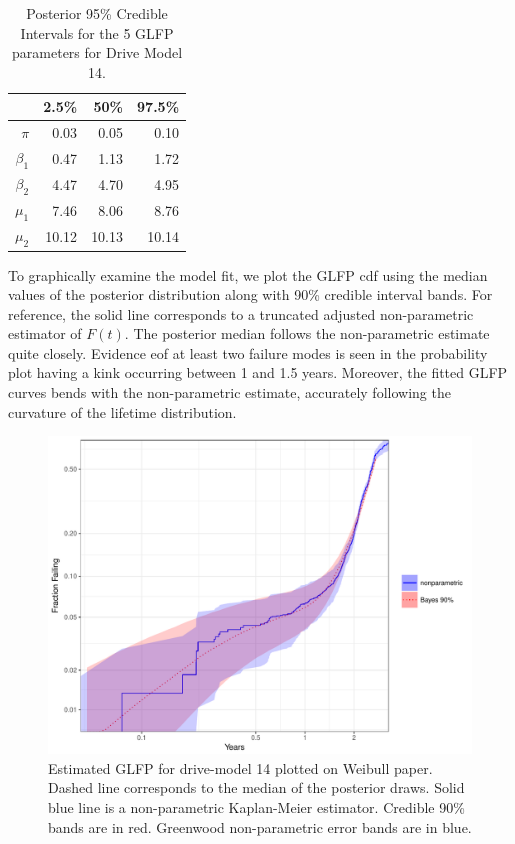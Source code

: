 \documentclass[12pt]{article}
\begin{document}
\begin{table}[H]
\centering
\begin{tabular}{rrrr}
  \hline
 & 2.5\% & 50\% & 97.5\% \\ 
  \hline
$\pi$ & 0.03 & 0.05 & 0.10 \\ 
 $\beta_1$ & 0.47 & 1.13 & 1.72 \\ 
  $\beta_2$ & 4.47 & 4.70 & 4.95 \\ 
  $\mu_1$ & 7.46 & 8.06 & 8.76 \\ 
  $\mu_2$ & 10.12 & 10.13 & 10.14 \\ 
   \hline
\end{tabular}
\caption{Posterior 95\% Credible Intervals for the 5 GLFP parameters for Drive Model 14.}
\label{table:1}
\end{table}

To graphically examine the model fit, we plot the GLFP cdf using the median values of the posterior distribution along with 90\% credible interval bands.  For reference, the solid line corresponds to a truncated adjusted non-parametric  estimator of $F(t)$.  The posterior median follows the non-parametric estimate quite closely.  Evidence eof at least two failure modes is seen in the probability plot having a kink occurring between 1 and 1.5 years.  Moreover, the fitted GLFP curves bends with the non-parametric estimate, accurately following the curvature of the lifetime distribution.

\begin{figure}[H]
\centering
  \includegraphics[width=.9\textwidth]{fig/drive14cred.pdf}
  \caption{Estimated GLFP for drive-model 14 plotted on Weibull paper.  Dashed line corresponds to the median of the posterior draws.  Solid blue line is a non-parametric Kaplan-Meier estimator.  Credible 90\% bands are in red.  Greenwood non-parametric error bands are in blue.}
  \label{fig1}
\end{figure}
\end{document}
